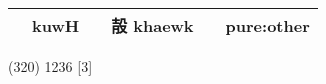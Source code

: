 \documentclass[14pt,a4paper]{scrartcl}
\begin{document}
\begin{longtable}[c]{@{}llllll@{}}
\begin{minipage}[t]{0.14\columnwidth}
\strut\end{minipage} &
\begin{minipage}[t]{0.14\columnwidth}\raggedright\strut
kuwH
\strut\end{minipage} &
\begin{minipage}[t]{0.14\columnwidth}\raggedright\strut
\strut\end{minipage} &
\begin{minipage}[t]{0.14\columnwidth}\raggedright\strut
㱿 khaewk
\strut\end{minipage} &
\begin{minipage}[t]{0.14\columnwidth}\raggedright\strut
\strut\end{minipage} &
\begin{minipage}[t]{0.14\columnwidth}\raggedright\strut
pure:other
\strut\end{minipage}\tabularnewline
\bottomrule
\end{longtable}

(320) 1236 {[}3{]}
\end{document}
